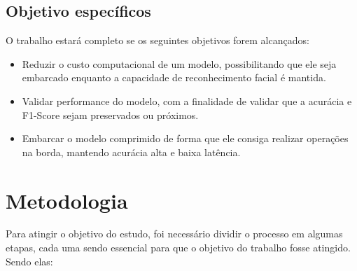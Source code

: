 \subsection{Objetivo específicos}
O trabalho estará completo se os seguintes objetivos forem alcançados:

\begin{itemize}
	\item Reduzir o custo computacional de um modelo, possibilitando que ele seja embarcado enquanto a capacidade
		de reconhecimento facial é mantida.
	\item Validar performance do modelo, com a finalidade de validar que a acurácia e F1-Score sejam preservados
		ou próximos.
	\item Embarcar o modelo comprimido de forma que ele consiga realizar operações na borda, mantendo acurácia
		alta e baixa latência.
\end{itemize}

\section{Metodologia}
Para atingir o objetivo do estudo, foi necessário dividir o processo em algumas etapas, cada uma sendo
essencial para que o objetivo do trabalho fosse atingido. Sendo elas:

